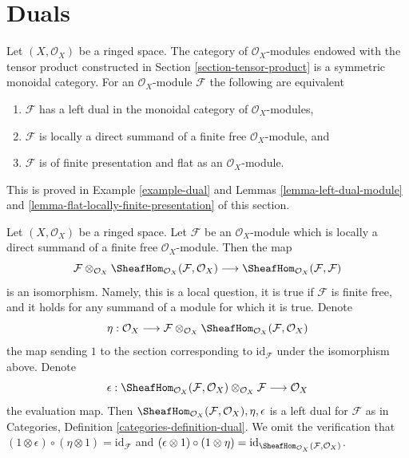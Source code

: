 \section{Duals}
\label{section-duals}

\noindent
Let $(X, \mathcal{O}_X)$ be a ringed space. The category of
$\mathcal{O}_X$-modules endowed with the tensor product
constructed in Section \ref{section-tensor-product}
is a symmetric monoidal category. For an $\mathcal{O}_X$-module
$\mathcal{F}$ the following are equivalent
\begin{enumerate}
\item $\mathcal{F}$ has a left dual in the monoidal category
of $\mathcal{O}_X$-modules,
\item $\mathcal{F}$ is locally a direct summand of a finite
free $\mathcal{O}_X$-module, and
\item $\mathcal{F}$ is of finite presentation and flat as an
$\mathcal{O}_X$-module.
\end{enumerate}
This is proved in Example \ref{example-dual} and
Lemmas \ref{lemma-left-dual-module} and
\ref{lemma-flat-locally-finite-presentation} of this section.

\begin{example}
\label{example-dual}
Let $(X, \mathcal{O}_X)$ be a ringed space. Let $\mathcal{F}$
be an $\mathcal{O}_X$-module which is locally a direct summand of a finite
free $\mathcal{O}_X$-module. Then the map
$$
\mathcal{F} \otimes_{\mathcal{O}_X}
\SheafHom_{\mathcal{O}_X}(\mathcal{F}, \mathcal{O}_X)
\longrightarrow
\SheafHom_{\mathcal{O}_X}(\mathcal{F}, \mathcal{F})
$$
is an isomorphism. Namely, this is a local question, it is true
if $\mathcal{F}$ is finite free, and it holds for any summand
of a module for which it is true. Denote
$$
\eta :
\mathcal{O}_X
\longrightarrow
\mathcal{F} \otimes_{\mathcal{O}_X}
\SheafHom_{\mathcal{O}_X}(\mathcal{F}, \mathcal{O}_X)
$$
the map sending $1$ to the section corresponding to
$\text{id}_\mathcal{F}$ under the isomorphism above.
Denote
$$
\epsilon : 
\SheafHom_{\mathcal{O}_X}(\mathcal{F}, \mathcal{O}_X)
\otimes_{\mathcal{O}_X} \mathcal{F}
\longrightarrow
\mathcal{O}_X
$$
the evaluation map. Then
$\SheafHom_{\mathcal{O}_X}(\mathcal{F}, \mathcal{O}_X), \eta, \epsilon$
is a left dual for $\mathcal{F}$ as in
Categories, Definition \ref{categories-definition-dual}.
We omit the verification that
$(1 \otimes \epsilon) \circ (\eta \otimes 1) = \text{id}_\mathcal{F}$
and
$(\epsilon \otimes 1) \circ (1 \otimes \eta) =
\text{id}_{\SheafHom_{\mathcal{O}_X}(\mathcal{F}, \mathcal{O}_X)}$.
\end{example}

